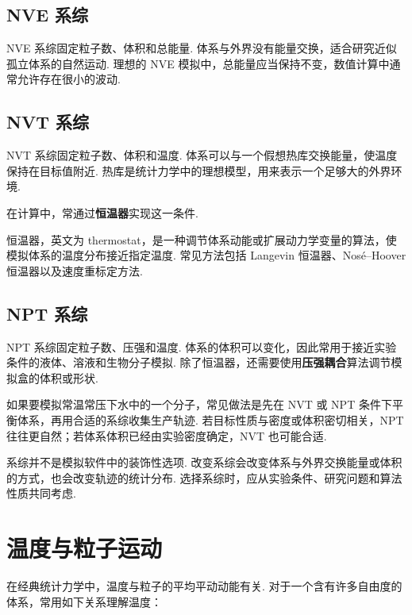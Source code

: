 \documentclass[UTF8,11pt,a4paper,openany]{ctexbook}
\newcommand{\term}[1]{\textbf{#1}}
\begin{document}
\subsection{NVE 系综}

NVE 系综固定粒子数、体积和总能量. 体系与外界没有能量交换，适合研究近似孤立体系的自然运动. 理想的 NVE 模拟中，总能量应当保持不变，数值计算中通常允许存在很小的波动. 

\subsection{NVT 系综}

NVT 系综固定粒子数、体积和温度. 体系可以与一个假想热库交换能量，使温度保持在目标值附近. 热库是统计力学中的理想模型，用来表示一个足够大的外界环境. 

在计算中，常通过\term{恒温器}实现这一条件. 

\begin{definitionbox}
恒温器，英文为 thermostat，是一种调节体系动能或扩展动力学变量的算法，使模拟体系的温度分布接近指定温度. 常见方法包括 Langevin 恒温器、Nosé--Hoover 恒温器以及速度重标定方法. 
\end{definitionbox}

\subsection{NPT 系综}

NPT 系综固定粒子数、压强和温度. 体系的体积可以变化，因此常用于接近实验条件的液体、溶液和生物分子模拟. 除了恒温器，还需要使用\term{压强耦合}算法调节模拟盒的体积或形状. 

\begin{examplebox}
如果要模拟常温常压下水中的一个分子，常见做法是先在 NVT 或 NPT 条件下平衡体系，再用合适的系综收集生产轨迹. 若目标性质与密度或体积密切相关，NPT 往往更自然；若体系体积已经由实验密度确定，NVT 也可能合适. 
\end{examplebox}

系综并不是模拟软件中的装饰性选项. 改变系综会改变体系与外界交换能量或体积的方式，也会改变轨迹的统计分布. 选择系综时，应从实验条件、研究问题和算法性质共同考虑. 

\section{温度与粒子运动}

在经典统计力学中，温度与粒子的平均平动动能有关. 对于一个含有许多自由度的体系，常用如下关系理解温度：
\end{document}
